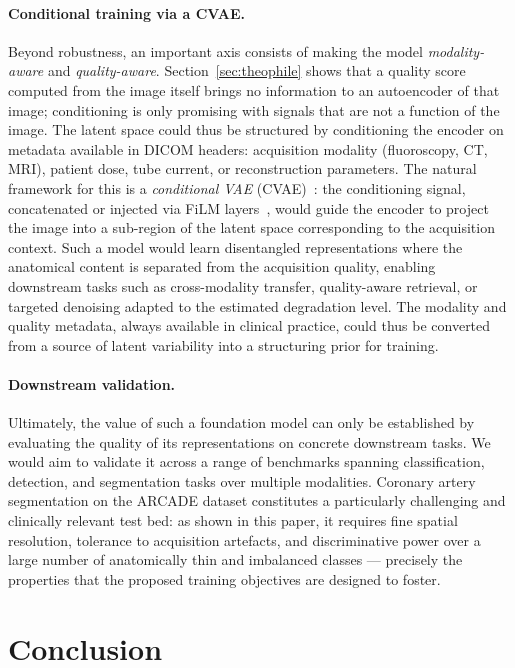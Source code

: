 \documentclass[conference]{IEEEtran}
\begin{document}
\paragraph{Conditional training via a CVAE.}
Beyond robustness, an important axis consists of making the model \emph{modality-aware} and \emph{quality-aware}. Section~\ref{sec:theophile} shows that a quality score computed from the image itself brings no information to an autoencoder of that image; conditioning is only promising with signals that are not a function of the image. The latent space could thus be structured by conditioning the encoder on metadata available in DICOM headers: acquisition modality (fluoroscopy, CT, MRI), patient dose, tube current, or reconstruction parameters. The natural framework for this is a \emph{conditional VAE} (CVAE)~\cite{sohn2015cvae}: the conditioning signal, concatenated or injected via FiLM layers~\cite{perez2018film}, would guide the encoder to project the image into a sub-region of the latent space corresponding to the acquisition context. Such a model would learn disentangled representations where the anatomical content is separated from the acquisition quality, enabling downstream tasks such as cross-modality transfer, quality-aware retrieval, or targeted denoising adapted to the estimated degradation level. The modality and quality metadata, always available in clinical practice, could thus be converted from a source of latent variability into a structuring prior for training.

\paragraph{Downstream validation.}
Ultimately, the value of such a foundation model can only be established by evaluating the quality of its representations on concrete downstream tasks. We would aim to validate it across a range of benchmarks spanning classification, detection, and segmentation tasks over multiple modalities. Coronary artery segmentation on the ARCADE dataset constitutes a particularly challenging and clinically relevant test bed: as shown in this paper, it requires fine spatial resolution, tolerance to acquisition artefacts, and discriminative power over a large number of anatomically thin and imbalanced classes --- precisely the properties that the proposed training objectives are designed to foster.

\section{Conclusion}
\end{document}
